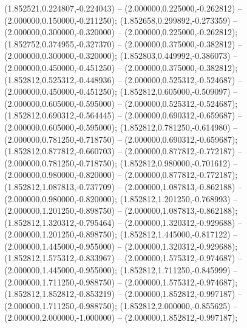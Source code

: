  (1.852521,0.224807,-0.224043) -- (2.000000,0.225000,-0.262812) -- (2.000000,0.150000,-0.211250);
 (1.852658,0.299892,-0.273359) -- (2.000000,0.300000,-0.320000) -- (2.000000,0.225000,-0.262812);
 (1.852752,0.374955,-0.327370) -- (2.000000,0.375000,-0.382812) -- (2.000000,0.300000,-0.320000);
 (1.852803,0.449992,-0.386073) -- (2.000000,0.450000,-0.451250) -- (2.000000,0.375000,-0.382812);
 (1.852812,0.525312,-0.448936) -- (2.000000,0.525312,-0.524687) -- (2.000000,0.450000,-0.451250);
 (1.852812,0.605000,-0.509097) -- (2.000000,0.605000,-0.595000) -- (2.000000,0.525312,-0.524687);
 (1.852812,0.690312,-0.564445) -- (2.000000,0.690312,-0.659687) -- (2.000000,0.605000,-0.595000);
 (1.852812,0.781250,-0.614980) -- (2.000000,0.781250,-0.718750) -- (2.000000,0.690312,-0.659687);
 (1.852812,0.877812,-0.660703) -- (2.000000,0.877812,-0.772187) -- (2.000000,0.781250,-0.718750);
 (1.852812,0.980000,-0.701612) -- (2.000000,0.980000,-0.820000) -- (2.000000,0.877812,-0.772187);
 (1.852812,1.087813,-0.737709) -- (2.000000,1.087813,-0.862188) -- (2.000000,0.980000,-0.820000);
 (1.852812,1.201250,-0.768993) -- (2.000000,1.201250,-0.898750) -- (2.000000,1.087813,-0.862188);
 (1.852812,1.320312,-0.795464) -- (2.000000,1.320312,-0.929688) -- (2.000000,1.201250,-0.898750);
 (1.852812,1.445000,-0.817122) -- (2.000000,1.445000,-0.955000) -- (2.000000,1.320312,-0.929688);
 (1.852812,1.575312,-0.833967) -- (2.000000,1.575312,-0.974687) -- (2.000000,1.445000,-0.955000);
 (1.852812,1.711250,-0.845999) -- (2.000000,1.711250,-0.988750) -- (2.000000,1.575312,-0.974687);
 (1.852812,1.852812,-0.853219) -- (2.000000,1.852812,-0.997187) -- (2.000000,1.711250,-0.988750);
 (1.852812,2.000000,-0.855625) -- (2.000000,2.000000,-1.000000) -- (2.000000,1.852812,-0.997187);
